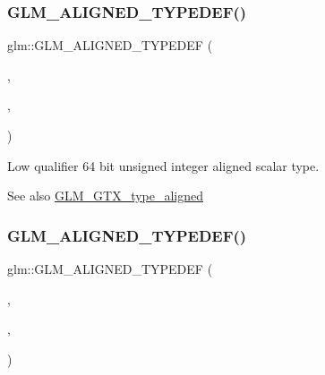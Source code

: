 \subsubsection{\texorpdfstring{G\+L\+M\+\_\+\+A\+L\+I\+G\+N\+E\+D\+\_\+\+T\+Y\+P\+E\+D\+E\+F()}{GLM\_ALIGNED\_TYPEDEF()}\hspace{0.1cm}{\footnotesize\ttfamily [76/209]}}
{\footnotesize\ttfamily glm\+::\+G\+L\+M\+\_\+\+A\+L\+I\+G\+N\+E\+D\+\_\+\+T\+Y\+P\+E\+D\+EF (\begin{DoxyParamCaption}\item[{\hyperlink{group__gtc__type__precision_gabf3069d4f188557a87b1d7f35eb0a270}{lowp\+\_\+uint64\+\_\+t}}]{,  }\item[{aligned\+\_\+lowp\+\_\+uint64\+\_\+t}]{,  }\item[{8}]{ }\end{DoxyParamCaption})}

Low qualifier 64 bit unsigned integer aligned scalar type. \begin{DoxySeeAlso}{See also}
\hyperlink{group__gtx__type__aligned}{G\+L\+M\+\_\+\+G\+T\+X\+\_\+type\+\_\+aligned} 
\end{DoxySeeAlso}
\mbox{\label{group__gtx__type__aligned_gad7bb97c29d664bd86ffb1bed4abc5534}} 
\subsubsection{\texorpdfstring{G\+L\+M\+\_\+\+A\+L\+I\+G\+N\+E\+D\+\_\+\+T\+Y\+P\+E\+D\+E\+F()}{GLM\_ALIGNED\_TYPEDEF()}\hspace{0.1cm}{\footnotesize\ttfamily [77/209]}}
{\footnotesize\ttfamily glm\+::\+G\+L\+M\+\_\+\+A\+L\+I\+G\+N\+E\+D\+\_\+\+T\+Y\+P\+E\+D\+EF (\begin{DoxyParamCaption}\item[{\hyperlink{group__gtc__type__precision_gae63f942c49a30dbf266b2f13f3efe257}{lowp\+\_\+u8}}]{,  }\item[{aligned\+\_\+lowp\+\_\+u8}]{,  }\item[{1}]{ }\end{DoxyParamCaption})}

